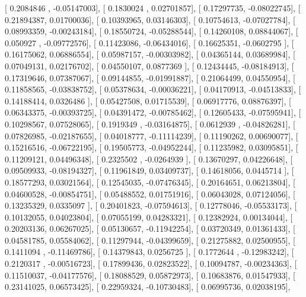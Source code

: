\documentclass{article}
\begin{document}
       [ 0.2084846 , -0.05147003],
       [ 0.1830024 ,  0.02701857],
       [ 0.17297735, -0.08022745],
       [ 0.21894387,  0.01700036],
       [ 0.10393965,  0.03146303],
       [ 0.10754613, -0.07027784],
       [ 0.08993359, -0.00243184],
       [ 0.18550724, -0.05288544],
       [ 0.14260108,  0.08844067],
       [ 0.050927  , -0.09772576],
       [ 0.11423086, -0.06434016],
       [ 0.16625351, -0.0602795 ],
       [ 0.16175062,  0.06886554],
       [ 0.05987157, -0.00303982],
       [ 0.04365144,  0.03689984],
       [ 0.07049131,  0.02176702],
       [ 0.04550107,  0.0877369 ],
       [ 0.12434445, -0.08184913],
       [ 0.17319646,  0.07387067],
       [ 0.09144855, -0.01991887],
       [ 0.21064499,  0.04550954],
       [ 0.11858565, -0.03838752],
       [ 0.05378634, -0.00036221],
       [ 0.04170913, -0.04513833],
       [ 0.14188414,  0.0326486 ],
       [ 0.05427508,  0.01715539],
       [ 0.06917776,  0.08876397],
       [ 0.06343375, -0.00393725],
       [ 0.04391472, -0.00785462],
       [ 0.12605433, -0.07595941],
       [ 0.10298567,  0.07528065],
       [ 0.1919349 , -0.03164875],
       [ 0.0612939 , -0.04826281],
       [ 0.07826985, -0.02187655],
       [ 0.04018777, -0.11114239],
       [ 0.11190262,  0.00690077],
       [ 0.15216516, -0.06722195],
       [ 0.19505773, -0.04952244],
       [ 0.11235982,  0.03095851],
       [ 0.11209121,  0.04496348],
       [ 0.2325502 , -0.0264939 ],
       [ 0.13670297,  0.04226648],
       [ 0.09509933, -0.08194327],
       [ 0.11961849,  0.03409737],
       [ 0.14618056,  0.0445714 ],
       [ 0.18577293,  0.03021564],
       [ 0.12545035, -0.07476345],
       [ 0.20164651,  0.06213804],
       [ 0.04600528, -0.00854751],
       [ 0.05488552,  0.01751916],
       [ 0.06043028,  0.07124056],
       [ 0.13235329,  0.0335097 ],
       [ 0.20401823, -0.07594613],
       [ 0.12778046, -0.05533173],
       [ 0.10132055,  0.04023804],
       [ 0.07055199,  0.04283321],
       [ 0.12382924,  0.00134044],
       [ 0.20203136,  0.06267025],
       [ 0.05130657, -0.11942254],
       [ 0.03720349,  0.01361433],
       [ 0.04581785,  0.05584062],
       [ 0.11297944, -0.04399659],
       [ 0.21275882,  0.02500955],
       [ 0.1411094 , -0.11469786],
       [ 0.14379843,  0.0256725 ],
       [ 0.1772644 , -0.12983242],
       [ 0.2120317 , -0.00516723],
       [ 0.17899436,  0.02823522],
       [ 0.10094787, -0.00234363],
       [ 0.11510037, -0.04177576],
       [ 0.18088529,  0.05872973],
       [ 0.10683876,  0.01547933],
       [ 0.23141025,  0.06573425],
       [ 0.22959324, -0.10730483],
       [ 0.06995736,  0.02038195],
\end{document}
